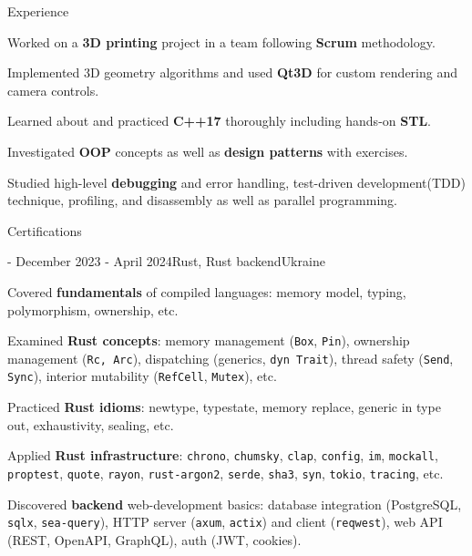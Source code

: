 \documentclass[11pt]{resume}
\begin{document}
\begin{rSection}{Experience}
\begin{rSubsection}
            \item Worked on a \textbf{3D printing} project in a team following \textbf{Scrum} methodology.
            \item Implemented 3D geometry algorithms and used \textbf{Qt3D} for custom rendering and camera controls.
            \item Learned about and practiced \textbf{C++17} thoroughly including hands-on \textbf{STL}.
            \item Investigated \textbf{OOP} concepts as well as \textbf{design patterns} with exercises.
            \item Studied high-level \textbf{debugging} and error handling, test-driven development(TDD) technique, profiling, and disassembly as well as parallel programming.
        \end{rSubsection}
    \end{rSection}

    \begin{rSection}{Certifications}
        \begin{rSubsection}
            {\href{https://www.uarust.com/}{\color{blue}\underline{}} - \href{https://github.com/rust-lang-ua/rustcamp}{\color{blue}\underline{}}}{December 2023 - April 2024}{Rust, Rust backend}{Ukraine}
            
            \item Covered \textbf{fundamentals} of compiled languages: memory model, typing, polymorphism, ownership, etc.
            \item Examined \textbf{Rust concepts}: memory management (\texttt{Box}, \texttt{Pin}), ownership management (\texttt{Rc, Arc}), dispatching (generics, \texttt{dyn Trait}), thread safety (\texttt{Send}, \texttt{Sync}), interior mutability (\texttt{RefCell}, \texttt{Mutex}), etc.
            \item Practiced \textbf{Rust idioms}: newtype, typestate, memory replace, generic in type out, exhaustivity, sealing, etc.
            \item Applied \textbf{Rust infrastructure}: \texttt{chrono}, \texttt{chumsky}, \texttt{clap}, \texttt{config}, \texttt{im}, \texttt{mockall}, \texttt{proptest}, \texttt{quote}, \texttt{rayon}, \texttt{rust-argon2}, \texttt{serde}, \texttt{sha3}, \texttt{syn}, \texttt{tokio}, \texttt{tracing}, etc.
            \item Discovered \textbf{backend} web-development basics: database integration (PostgreSQL, \texttt{sqlx}, \texttt{sea-query}), HTTP server (\texttt{axum}, \texttt{actix}) and client (\texttt{reqwest}), web API (REST, OpenAPI, GraphQL), auth (JWT, cookies).
        \end{rSubsection}
    \end{rSection}
\end{document}

